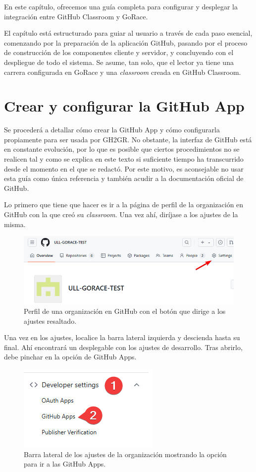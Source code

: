 En este capítulo, ofrecemos una guía completa para configurar y desplegar la integración entre GitHub Classroom y GoRace.

El capítulo está estructurado para guiar al usuario a través de cada paso esencial, comenzando por la preparación de la aplicación GitHub, pasando por el proceso de construcción de los componentes cliente y servidor, y concluyendo con el despliegue de todo el sistema. Se asume, tan solo, que el lector ya tiene una carrera configurada en GoRace y una \textit{classroom} creada en GitHub Classroom.

\section{Crear y configurar la GitHub App} \label{title:create-gh-app}
Se procederá a detallar cómo crear la GitHub App y cómo configurarla propiamente para ser usada por GH2GR. No obstante, la interfaz de GitHub está en constante evolución, por lo que es posible que ciertos procedimientos no se realicen tal y como se explica en este texto si suficiente tiempo ha transcurrido desde el momento en el que se redactó. Por este motivo, es aconsejable no usar esta guía como única referencia y también acudir a la documentación oficial de GitHub.

Lo primero que tiene que hacer es ir a la página de perfil de la organización en GitHub con la que creó su \textit{classroom}. Una vez ahí, diríjase a los ajustes de la misma.

\begin{figure}[H]
    \centering
    \includegraphics[width=0.5\linewidth]{images/goto-settings.png}
    \caption{Perfil de una organización en GitHub con el botón que dirige a los ajustes resaltado.}
\end{figure}

Una vez en los ajustes, localice la barra lateral izquierda y descienda hasta su final. Ahí encontrará un desplegable con los ajustes de desarrollo. Tras abrirlo, debe pinchar en la opción de GitHub Apps.

\begin{figure}[H]
    \centering
    \includegraphics[width=0.5\linewidth]{images/dev-setting-gapps.png}
    \caption{Barra lateral de los ajustes de la organización mostrando la opción para ir a las GitHub Apps.}
\end{figure}

